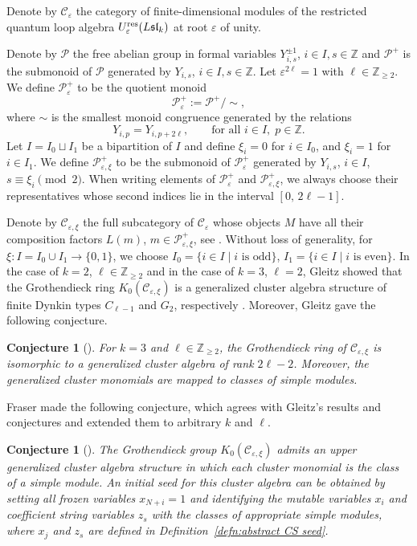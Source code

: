 \documentclass[11pt, reqno]{amsart}
\theoremstyle{plain}
\newtheorem{conjecture}[theorem]{Conjecture}
\theoremstyle{definition}
\numberwithin{equation}{section}
\newcommand{\ZZ}{{\mathbb {Z}}}
\newcommand{\res}{{\rm res}}
\begin{document}
Denote by $\mathcal{C}_{\varepsilon}$ the category of finite-dimensional modules of the restricted quantum loop algebra $U_\varepsilon^{\res}({L\mathfrak{sl}_k})$ at root $\varepsilon$ of unity. 

Denote by $\mathcal{P}$ the free abelian group in formal variables $Y^{\pm 1}_{i,s}$, $i\in I, s\in \ZZ$ and $\mathcal{P}^+$ is the submonoid of $\mathcal{P}$ generated by $Y_{i,s}$, $i\in I, s\in \ZZ$. Let $\varepsilon^{2 \ell}=1$ with $\ell\in \ZZ_{\geq 2}$. We define $\mathcal{P}^+_{\varepsilon}$ to be the quotient monoid
\[
\mathcal{P}^+_{\varepsilon}
:=
\mathcal{P}^+ \big/ \sim,
\]
where $\sim$ is the smallest monoid congruence generated by the relations
\[
Y_{i,p} = Y_{i,p+2\ell},
\qquad
\text{for all } i\in I,\; p\in \mathbb{Z}.
\]
Let $I = I_0 \sqcup I_1$ be a bipartition of $I$ and define $\xi_i=0$ for $i \in I_0$, and $\xi_i=1$ for $i \in I_1$. 
We define $\mathcal{P}^+_{\varepsilon,\xi}$ to be the submonoid of
$\mathcal{P}^+_{\varepsilon}$ generated by $Y_{i,s}$, $i\in I$, $s \equiv \xi_i \pmod{2}$.
When writing elements of $\mathcal{P}^+_{\varepsilon}$ and $\mathcal{P}^+_{\varepsilon, \xi}$, we always choose their representatives whose second indices lie in the interval
$[0,\,2\ell-1]$.

Denote by $\mathcal{C}_{\varepsilon, \xi}$ the full subcategory of $\mathcal{C}_{\varepsilon}$ whose objects $M$ have all their composition factors $L(m)$, $m \in \mathcal{P}^+_{\varepsilon, \xi}$, see \cite[Section 3.3]{Gle16}. Without loss of generality, for $\xi: I = I_0 \cup I_1 \to \{0,1\}$, we choose $I_0 =\{ i\in I \mid i \text{ is odd}\}$, $I_1 =\{ i\in I \mid i \text{ is even}\}$. In the case of $k=2$, $\ell \in \ZZ_{\ge 2}$ and in the case of $k=3$, $\ell=2$, Gleitz showed that the Grothendieck ring $K_0(\mathcal{C}_{\varepsilon, \xi})$ is a generalized cluster algebra structure of finite Dynkin types $C_{\ell-1}$ and $G_2$, respectively \cite[Theorem 4.1 and 5.3]{Gle16}. Moreover, Gleitz gave the following conjecture.

\begin{conjecture} [{\cite[Conjecture 5.4]{Gle16}}] \label{conj: Gleitz conjecture}
For $k=3$ and $\ell \in \mathbb{Z}_{\geq 2}$, the Grothendieck ring of $\mathcal{C}_{\varepsilon, \xi}$ is isomorphic to a generalized cluster algebra of rank $2 \ell-2$. Moreover, the generalized cluster monomials are mapped to classes of simple modules.
\end{conjecture}

Fraser made the following conjecture, which agrees with Gleitz's results and conjectures and extended them to arbitrary $k$ and $\ell$.
\begin{conjecture}[{\cite[Conjecture 8.8]{Fra20}}]
The Grothendieck group $K_0(\mathcal{C}_{\varepsilon, \xi})$ admits an upper generalized cluster algebra structure in which each cluster monomial is the class of a simple module. An initial seed for this cluster algebra can be obtained by setting all frozen variables $x_{N+i} = 1$ and identifying the mutable variables $x_i$ and coefficient string variables $z_s$ with the classes of appropriate simple modules, where $x_j$ and $z_s$ are defined in Definition~\ref{defn:abstract CS seed}. 
\end{conjecture}
\end{document}
